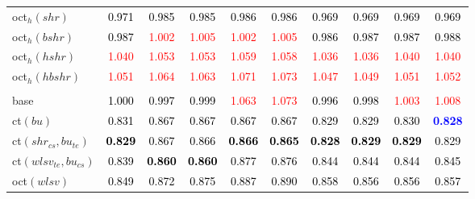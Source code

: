 \begin{tabular}[t]{>{\centering\arraybackslash}m{2.5cm}ccccccccc}
oct$_h(shr)$ & \textcolor{black}{0.971} & \textcolor{black}{0.985} & \textcolor{black}{0.985} & \textcolor{black}{0.986} & \textcolor{black}{0.986} & \textcolor{black}{0.969} & \textcolor{black}{0.969} & \textcolor{black}{0.969} & \textcolor{black}{0.969}\\
oct$_h(bshr)$ & \textcolor{black}{0.987} & \textcolor{red}{1.002} & \textcolor{red}{1.005} & \textcolor{red}{1.002} & \textcolor{red}{1.005} & \textcolor{black}{0.986} & \textcolor{black}{0.987} & \textcolor{black}{0.987} & \textcolor{black}{0.988}\\
oct$_h(hshr)$ & \textcolor{red}{1.040} & \textcolor{red}{1.053} & \textcolor{red}{1.053} & \textcolor{red}{1.059} & \textcolor{red}{1.058} & \textcolor{red}{1.036} & \textcolor{red}{1.036} & \textcolor{red}{1.040} & \textcolor{red}{1.040}\\
oct$_h(hbshr)$ & \textcolor{red}{1.051} & \textcolor{red}{1.064} & \textcolor{red}{1.063} & \textcolor{red}{1.071} & \textcolor{red}{1.073} & \textcolor{red}{1.047} & \textcolor{red}{1.049} & \textcolor{red}{1.051} & \textcolor{red}{1.052}\\
\addlinespace[0.3em]
\multicolumn{10}{c}{\textbf{$k = 2$}}\\
base & \textcolor{black}{1.000} & \textcolor{black}{0.997} & \textcolor{black}{0.999} & \textcolor{red}{1.063} & \textcolor{red}{1.073} & \textcolor{black}{0.996} & \textcolor{black}{0.998} & \textcolor{red}{1.003} & \textcolor{red}{1.008}\\
ct$(bu)$ & \textcolor{black}{0.831} & \textcolor{black}{0.867} & \textcolor{black}{0.867} & \textcolor{black}{0.867} & \textcolor{black}{0.867} & \textcolor{black}{0.829} & \textcolor{black}{0.829} & \textcolor{black}{0.830} & \textcolor{blue}{\textbf{0.828}}\\
ct$(shr_{cs}, bu_{te})$ & \textcolor{black}{\textbf{0.829}} & \textcolor{black}{0.867} & \textcolor{black}{0.866} & \textcolor{black}{\textbf{0.866}} & \textcolor{black}{\textbf{0.865}} & \textcolor{black}{\textbf{0.828}} & \textcolor{black}{\textbf{0.829}} & \textcolor{black}{\textbf{0.829}} & \textcolor{black}{0.829}\\
ct$(wlsv_{te}, bu_{cs})$ & \textcolor{black}{0.839} & \textcolor{black}{\textbf{0.860}} & \textcolor{black}{\textbf{0.860}} & \textcolor{black}{0.877} & \textcolor{black}{0.876} & \textcolor{black}{0.844} & \textcolor{black}{0.844} & \textcolor{black}{0.844} & \textcolor{black}{0.845}\\
oct$(wlsv)$ & \textcolor{black}{0.849} & \textcolor{black}{0.872} & \textcolor{black}{0.875} & \textcolor{black}{0.887} & \textcolor{black}{0.890} & \textcolor{black}{0.858} & \textcolor{black}{0.856} & \textcolor{black}{0.856} & \textcolor{black}{0.857}\\

\end{tabular}
